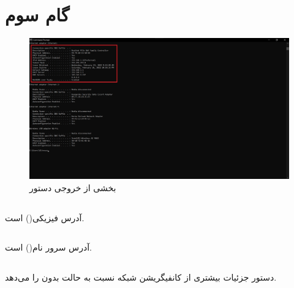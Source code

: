 \documentclass{article}
\begin{document}
\section{گام سوم}
\begin{figure}[H]
    \centering
    \includegraphics[width=1.0\textwidth]{figures/3.1.jpg}
    \caption
	{
بخشی از خروجی دستور 
	}
    \label{fig:fig1}
\end{figure}

\subsection{}
آدرس فیزیکی()  است.
\subsection{}
آدرس سرور نام()  است.
\subsection{}
دستور  جزئیات بیشتری از کانفیگریشن شبکه نسبت به حالت بدون  را می‌دهد.
\end{document}
